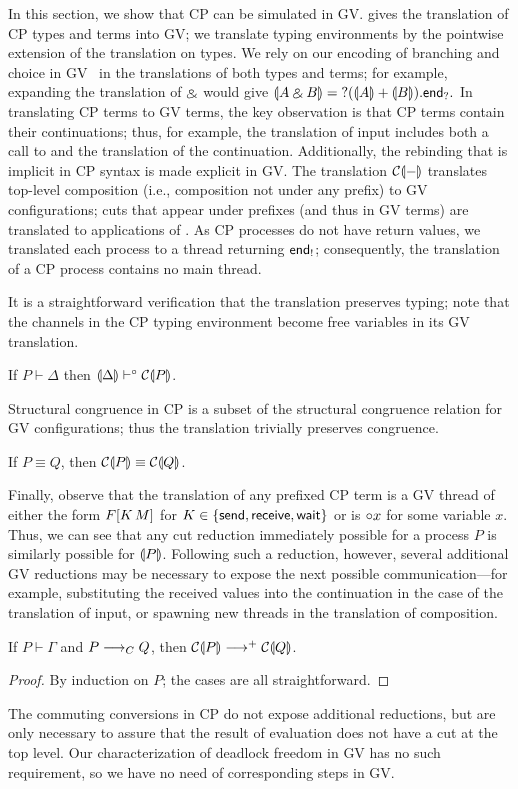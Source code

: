 \documentclass[orivec,envcountsame]{llncs}
\begin{document}
In this section, we show that CP can be simulated in GV.   gives the translation of
CP types and terms into GV; we translate typing environments by the pointwise extension of the
translation on types.  We rely on our encoding of branching and choice in GV~ in
the translations of both types and terms; for example, expanding the translation of $\mathbin\binampersand$ would
give $\llparenthesis A \mathbin\binampersand B \rrparenthesis = {?(\llparenthesis A \rrparenthesis + \llparenthesis B \rrparenthesis).\mathsf{end}_?}.$ In translating CP terms to GV
terms, the key observation is that CP terms contain their continuations; thus, for example, the
translation of input includes both a call to  and the translation of the
continuation.  Additionally, the rebinding that is implicit in CP syntax is made explicit in GV.
The translation $\mathcal{C}\llparenthesis - \rrparenthesis$ translates top-level composition (i.e., composition not under any
prefix) to GV configurations; cuts that appear under prefixes (and thus in GV terms) are translated
to applications of .  As CP processes do not have return values, we translated each
process to a thread returning $\mathsf{end}_!$; consequently, the translation of a CP process contains no
main thread.

It is a straightforward verification that the translation preserves typing; note that the channels
in the CP typing environment become free variables in its GV translation.
%
\begin{theorem}
If $P \vdash \Delta$ then $\llparenthesis \Delta \rrparenthesis \vdash^{\mathord{\circ}} \mathcal{C}\llparenthesis P \rrparenthesis$.
\end{theorem}
%
Structural congruence in CP is a subset of the structural congruence relation for GV configurations;
thus the translation trivially preserves congruence.
%
\begin{theorem}
If $P \equiv Q$, then $\mathcal{C}\llparenthesis P \rrparenthesis \equiv \mathcal{C}\llparenthesis Q \rrparenthesis$.
\end{theorem}
%
Finally, observe that the translation of any prefixed CP term is a GV thread of either the form $F[K
\, M]$ for $K \in \{ \mathsf{send}, \mathsf{receive}, \mathsf{wait} \}$ or is ${\mathord{\circ}} x$ for
some variable $x$.  Thus, we can see that any cut reduction immediately possible for a process $P$
is similarly possible for $\llparenthesis P \rrparenthesis$.  Following such a reduction, however, several additional GV
reductions may be necessary to expose the next possible communication---for example, substituting
the received values into the continuation in the case of the translation of input, or spawning new
threads in the translation of composition.
%
\begin{theorem}\label{thm:cp-reduction-simulated}
If $P \vdash \Gamma$ and $P \longrightarrow_C Q$, then $\mathcal{C}\llparenthesis P \rrparenthesis \longrightarrow^+ \mathcal{C}\llparenthesis Q \rrparenthesis$.
\end{theorem}
%
\begin{proof}
  By induction on $P$; the cases are all straightforward.
\end{proof}
%
The commuting conversions in CP do not expose additional reductions, but are only necessary to
assure that the result of evaluation does not have a cut at the top level.  Our characterization of
deadlock freedom in GV has no such requirement, so we have no need of corresponding steps in GV.
\end{document}
